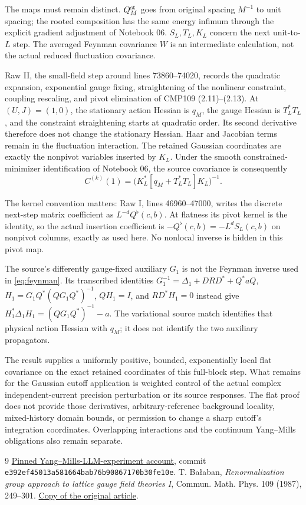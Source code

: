 \documentclass[11pt]{article}
\theoremstyle{remark}
\begin{document}
The maps must remain distinct. $Q_M^{\rm st}$ goes from original
spacing $M^{-1}$ to unit spacing; the rooted composition has the
same energy infimum through the explicit gradient adjustment of
Notebook 06. $S_L,T_L,K_L$ concern the next unit-to-$L$ step.
The averaged Feynman covariance $W$ is an intermediate calculation,
not the actual reduced fluctuation covariance.

Raw II, the small-field step around lines 73860--74020, records the
quadratic expansion, exponential gauge fixing, straightening of the
nonlinear constraint, coupling rescaling, and pivot elimination of
CMP109 (2.11)--(2.13). At $(U,J)=(1,0)$, the stationary action
Hessian is $q_M$, the gauge Hessian is $T_L^*T_L$, and the constraint
straightening starts at quadratic order. Its second derivative
therefore does not change the stationary Hessian. Haar and Jacobian
terms remain in the fluctuation interaction. The retained Gaussian
coordinates are exactly the nonpivot variables inserted by $K_L$.
Under the smooth constrained-minimizer identification of Notebook 06,
the source covariance is consequently
\[
 C^{(k)}(1)=\bigl(K_L^*[q_M+T_L^*T_L]K_L\bigr)^{-1}.
\]

The kernel convention matters: Raw I, lines 46960--47000, writes
the discrete next-step matrix coefficient as $L^{-d}Q^\flat(c,b)$.
At flatness its pivot kernel is the identity, so the actual insertion
coefficient is $-Q^\flat(c,b)=-L^dS_L(c,b)$ on nonpivot columns,
exactly as used here. No nonlocal inverse is hidden in this pivot map.

The source's differently gauge-fixed auxiliary $G_1$ is not the
Feynman inverse used in \eqref{eq:feynman}. Its transcribed identities
$G_1^{-1}=\Delta_1+DRD^*+Q^*aQ$,
$H_1=G_1Q^*(QG_1Q^*)^{-1}$, $QH_1=I$, and $RD^*H_1=0$
instead give $H_1^*\Delta_1H_1=(QG_1Q^*)^{-1}-a$.
The variational source match identifies that physical action Hessian
with $q_M$; it does not identify the two auxiliary propagators.

The result supplies a uniformly positive, bounded, exponentially
local flat covariance on the exact retained coordinates of this
full-block step. What remains for the Gaussian cutoff application
is weighted control of the actual complex independent-current
precision perturbation or its source responses. The flat proof
does not provide those derivatives, arbitrary-reference background
locality, mixed-history domain bounds, or permission to change a
sharp cutoff's integration coordinates. Overlapping interactions
and the continuum Yang--Mills obligations also remain separate.

\begin{thebibliography}{9}
 \href{https://github.com/ethanwsussman/Yang--Mills-LLM-experiment/tree/e392ef45013a581664bab76b90867170b30fe10e}
{Pinned Yang--Mills-LLM-experiment account}, commit
\texttt{e392ef45013a581664bab76b90867170b30fe10e}.
 T. Ba\l aban,
\emph{Renormalization group approach to lattice gauge field theories I},
Commun. Math. Phys. 109 (1987), 249--301.
\href{https://scispace.com/pdf/renormalization-group-approach-to-lattice-gauge-field-3ygai0vxt1.pdf}
{Copy of the original article}.
\end{thebibliography}
\end{document}
